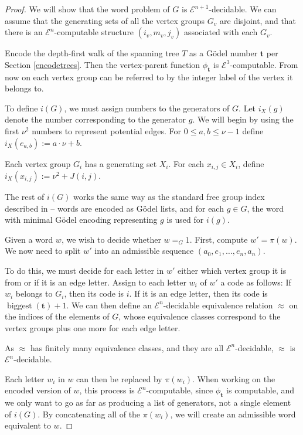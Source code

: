 \documentclass[a4paper]{article}
\newcommand{\grz}[1]{$\mathcal{E}^{#1}$}	%
\newcommand{\tvec}{\mathbf{t}}	%
\theoremstyle{plain}
\theoremstyle{definition}
\begin{document}
\begin{proof}
	We will show that the word problem of $G$ is \grz{n+1}-decidable. We can assume that the generating sets of all the vertex groups $G_v$ are disjoint, and that there is an \grz{n}-computable structure $(i_v,m_v,j_v)$ associated with 
each $G_v$.

Encode the depth-first walk of the spanning tree $T$ as a G\"odel number $\tvec$ per Section \ref{encodetrees}. Then the vertex-parent function $\phi_{\tvec}$ is \grz{3}-computable. From now on each vertex group can be referred to by the integer label of the vertex it belongs to.

To define $i(G)$, we must assign numbers to the generators of $G$. Let $i_X(g)$ denote the number corresponding to the generator $g$. We will begin by using the first $\nu^2$ numbers to represent potential edges. For $0 \leq a,b \leq \nu - 1$ define $i_X(e_{a,b}) := a \cdot \nu + b$.

Each vertex group $G_i$ has a generating set $X_i$. For each $x_{i,j} \in X_i$, define $i_X(x_{i,j}) := \nu^2 + J(i,j)$.

The rest of $i(G)$ works the same way as the standard free group index described in \cite[3.1]{Cannonito_1973} -- words are encoded as G\"odel lists, and for each $g \in G$, the word with minimal G\"odel encoding representing $g$ is used for $i(g)$.	

Given a word $w$, we wish to decide whether $w =_G 1$. First, compute $w' = \pi(w)$. We now need to split $w'$ into an admissible sequence $(a_0,e_1,\dots,e_n,a_n)$.

To do this, we must decide for each letter in $w'$ either which vertex group it is from or if it is an edge letter. Assign to each letter $w_i$ of $w'$ a code as follows: If $w_i$ belongs to $G_i$, then its code is $i$. If it is an edge letter, then its code is $\operatorname{biggest}(\tvec)+1$. We can then define an \grz{n}-decidable equivalence relation $\approx$ on the indices of the elements of $G$, whose equivalence classes correspond to the vertex groups plus one more for each edge letter.

As $\approx$ has finitely many equivalence classes, and they are all \grz{n}-decidable, $\approx$ is \grz{n}-decidable.

Each letter $w_i$ in $w$ can then be replaced by $\pi(w_i)$. When working on the encoded version of $w$, this process is \grz{n}-computable, since $\phi_{\tvec}$ is computable, and we only want to go as far as producing a list of generators, not a single element of $i(G)$. By concatenating all of the $\pi(w_i)$, we will create an admissible word equivalent to $w$.


\end{proof}
\end{document}

